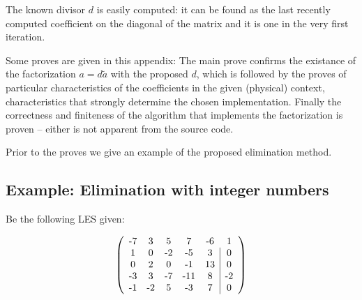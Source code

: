 The known divisor $d$ is easily computed: it can be found as the last
recently computed coefficient on the diagonal of the matrix and it is one
in the very first iteration.

Some proves are given in this appendix: The main prove confirms the
existance of the factorization $a = d \tilde a$ with the proposed $d$,
which is followed by the proves of particular characteristics of the
coefficients in the given (physical) context, characteristics that
strongly determine the chosen implementation. Finally the correctness and
finiteness of the algorithm that implements the factorization is proven --
either is not apparent from the source code.

Prior to the proves we give an example of the proposed elimination method.


\subsection{Example: Elimination with integer numbers}
\label{secExampleElimMethod}

%

Be the following LES given:

\begin{equation}
\label{eqSampleLES}
\left(
\begin{array}{ccccc|c}
$-7$ &  $3$ &  $5$ &  $7$  & $-6$  &  $1$ \\
 $1$ &  $0$ & $-2$ & $-5$  &  $3$  &  $0$ \\
 $0$ &  $2$ &  $0$ & $-1$  &  $13$ &  $0$ \\
$-3$ &  $3$ & $-7$ & $-11$ &  $8$  & $-2$ \\
$-1$ & $-2$ &  $5$ & $-3$  &  $7$  &  $0$
\end{array}
\right)
\end{equation}

